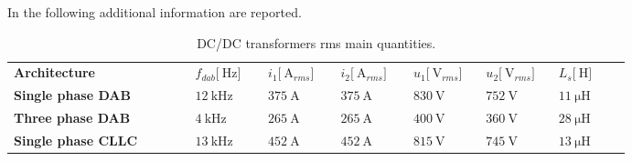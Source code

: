 \documentclass[12pt,a4paper]{scrartcl}
\begin{document}
\begin{onehalfspace}
In the following additional information are reported.
\begin{center}	
	\doublespacing
	\begin{longtable}{p{0.25\linewidth}|p{0.1\linewidth}|p{0.1\linewidth}|p{0.1\linewidth}|p{0.1\linewidth}|p{0.1\linewidth}|p{0.1\linewidth}}
		\captionsetup{width=0.65\textwidth, font=small}
		\caption{DC/DC transformers rms main quantities.}
		\label{transformers_data_design} \\
		\hline\hline
		\textbf{Architecture} & \hspace*{\fill} $f_{dab}\big[\SI{}{\hertz}\big]$  & \hspace*{\fill} $i_{1}\big[\SI{}{\ampere}_{rms}\big]$ & \hspace*{\fill}  $i_{2}\big[\SI{}{\ampere}_{rms}\big]$  & \hspace*{\fill}  $u_{1}\big[\SI{}{\volt}_{rms}\big]$ & \hspace*{\fill} $u_{2}\big[\SI{}{\volt}_{rms}\big]$ & \hspace*{\fill} $L_s\big[\SI{}{\henry}\big]$\\
		\hline
		\textbf{Single phase DAB} & \hspace*{\fill} $\SI{12}{\kilo\hertz}$ & \hspace*{\fill} $\SI{375}{\ampere}$  & \hspace*{\fill} $\SI{375}{\ampere}$  & \hspace*{\fill} $\SI{830}{\volt}$ & \hspace*{\fill} $\SI{752}{\volt}$ & \hspace*{\fill} $\SI{11}{\micro\henry}$\\
		\hline
		\textbf{Three phase DAB} & \hspace*{\fill} $\SI{4}{\kilo\hertz}$ & \hspace*{\fill} $\SI{265}{\ampere}$  & \hspace*{\fill} $\SI{265}{\ampere}$  & \hspace*{\fill} $\SI{400}{\volt}$ & \hspace*{\fill} $\SI{360}{\volt}$ & \hspace*{\fill} $\SI{28}{\micro\henry}$\\
		\hline
		\textbf{Single phase CLLC} & \hspace*{\fill} $\SI{13}{\kilo\hertz}$ & \hspace*{\fill} $\SI{452}{\ampere}$  & \hspace*{\fill} $\SI{452}{\ampere}$  & \hspace*{\fill} $\SI{815}{\volt}$ & \hspace*{\fill} $\SI{745}{\volt}$ & \hspace*{\fill} $\SI{13}{\micro\henry}$\\
		\hline\hline
	\end{longtable}
\end{center}


\end{onehalfspace}
\end{document}

